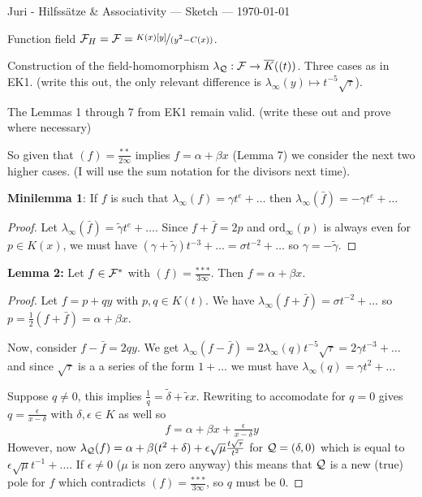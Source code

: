 \documentclass[english,11pt,a4paper]{article}
\begin{document}
\scriptsize \hfill Juri - Hilfssätze \& Associativity --- Sketch --- \today \normalsize

Function field $\mathcal{F}_H = \mathcal{F} = \nicefrac{K(x)[y]}{(y^2-C(x))}$.

Construction of the field-homomorphism $\lambda_{\mathcal{Q}}: \mathcal{F} \rightarrow \overline K((t))$. Three cases as in EK1. (write this out, the only relevant difference is $\lambda_\infty(y) \mapsto t^{-5}\sqrt\tau$).

The Lemmas 1 through 7 from EK1 remain valid. (write these out and prove where necessary)

So given that $(f) = \frac{* *}{2\infty}$ implies $f=\alpha + \beta x$ (Lemma 7) we consider the next two higher cases. (I will use the sum notation for the divisors next time).

\vspace{-3mm}
\fline
\vspace{-3.5mm}

\textbf{Minilemma 1}: If $f$ is such that $\lambda_\infty (f)=\gamma t^e + \dots$ then $\lambda_\infty (\bar f)=-\gamma t^e + \dots$

\begin{proof}
	Let $\lambda_\infty (\bar f) = \tilde \gamma t^e + \dots$. Since $f + \bar f = 2p$ and ord$_\infty(p)$ is always even for $p \in K(x)$, we must have $(\gamma + \tilde \gamma)t^{-3} + \dots = \sigma t^{-2} + \dots$ so $\gamma = - \tilde \gamma$.
\end{proof}

\textbf{Lemma 2:} Let $f \in \mathcal{F}^*$ with $(f)=\frac{***}{3\infty}$. Then $f = \alpha + \beta x$.
\begin{proof}
	Let $f=p+qy$ with $p, q \in K(t)$. We have $\lambda_\infty (f + \bar f) = \sigma t^{-2} + \dots$ so $p = \frac{1}{2} (f+\bar f) = \alpha + \beta x$.

	Now, consider $f-\bar f = 2qy$. We get $\lambda_\infty (f-\bar f) = 2 \lambda_\infty (q) t^{-5} \sqrt \tau = 2 \gamma t^{-3}+\dots$ and since $\sqrt \tau$ is a a series of the form $1 + \dots$ we must have $\lambda_\infty (q) = \gamma t^2 + \dots$

	Suppose $q \neq 0$, this implies $\frac{1}{q} = \tilde \delta + \tilde \epsilon x$. Rewriting to accomodate for $q=0$ gives $q=\frac{\epsilon}{x-\delta}$ with $\delta, \epsilon \in K$ as well so
	\begin{align*}
	  f=\alpha + \beta x +\frac{\epsilon}{x-\delta}y
	\end{align*}
	However, now $\lambda_{\mathcal{Q}} (f) = \alpha + \beta (t^2+\delta) + \epsilon \sqrt \mu \frac{t \sqrt \tau}{t^2}$ for $\mathcal{Q} = (\delta,0)$ which is equal to $\epsilon \sqrt \mu t^{-1} + \dots$. If $\epsilon \neq 0$ ($\mu$ is non zero anyway) this means that $\mathcal{Q}$ is a new (true) pole for $f$ which contradicts $(f)=\frac{***}{3\infty}$, so $q$ must be 0.
\end{proof}
\end{document}
